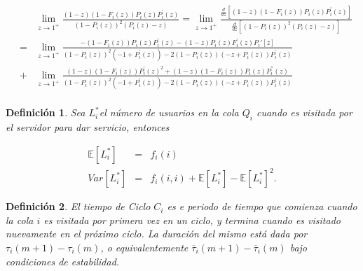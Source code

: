 \documentclass{article}
\newtheorem{Def}{Definición}
\newcommand{\esp}{\mathbb{E}}
\begin{document}
\begin{eqnarray*}
&&\lim_{z\rightarrow1^{+}}\frac{\left(1-z\right)\left(1-F_{i}\left(z\right)\right)P_{i}\left(z\right)P_{i}^{'}\left(z\right)}{\left(1-P_{i}\left(z\right)\right)^{2}\left(P_{i}\left(z\right)-z\right)}=\lim_{z\rightarrow1^{+}}\frac{\frac{d}{dz}\left[\left(1-z\right)\left(1-F_{i}\left(z\right)\right)P_{i}\left(z\right)P_{i}^{'}\left(z\right)\right]}{\frac{d}{dz}\left[\left(1-P_{i}\left(z\right)\right)^{2}\left(P_{i}\left(z\right)-z\right)\right]}\\
&=&\lim_{z\rightarrow1^{+}}\frac{-\left(1-F_{i}\left(z\right)\right) P_{i}\left(z\right) P_{i}^{'}\left(z\right)-(1-z) P_{i}\left(z\right) F_{i}^{'}\left(z\right)P_i'[z]}{\left(1-P_{i}\left(z\right)\right)^2 \left(-1+P_{i}^{'}\left(z\right)\right)-2 \left(1-P_{i}\left(z\right)\right) \left(-z+P_{i}\left(z\right)\right) P_{i}^{'}\left(z\right)}\\
&+&\lim_{z\rightarrow1^{+}}\frac{(1-z) \left(1-F_{i}\left(z\right)\right) P_{i}^{'}\left(z\right)^2+(1-z) \left(1-F_{i}\left(z\right)\right) P_{i}\left(z\right) P_{i}^{''}\left(z\right)}{\left(1-P_{i}\left(z\right)\right)^2 \left(-1+P_{i}^{'}\left(z\right)\right)-2 \left(1-P_{i}\left(z\right)\right) \left(-z+P_{i}\left(z\right)\right) P_{i}^{'}\left(z\right)}\\
\end{eqnarray*}


\begin{Def}
Sea $L_{i}^{*}$el n\'umero de usuarios en la cola $Q_{i}$ cuando es visitada por el servidor para dar servicio, entonces

\begin{eqnarray}
\esp\left[L_{i}^{*}\right]&=&f_{i}\left(i\right)\\
Var\left[L_{i}^{*}\right]&=&f_{i}\left(i,i\right)+\esp\left[L_{i}^{*}\right]-\esp\left[L_{i}^{*}\right]^{2}.
\end{eqnarray}

\end{Def}

\begin{Def}
El tiempo de Ciclo $C_{i}$ es e periodo de tiempo que comienza cuando la cola $i$ es visitada por primera vez en un ciclo, y termina cuando es visitado nuevamente en el pr\'oximo ciclo. La duraci\'on del mismo est\'a dada por $\tau_{i}\left(m+1\right)-\tau_{i}\left(m\right)$, o equivalentemente $\overline{\tau}_{i}\left(m+1\right)-\overline{\tau}_{i}\left(m\right)$ bajo condiciones de estabilidad.
\end{Def}
\end{document}
